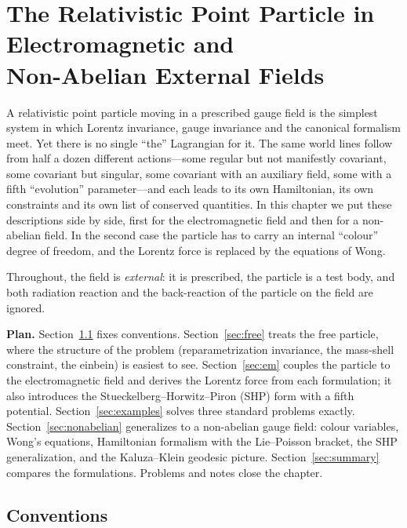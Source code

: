 \documentclass[11pt,a4paper]{book}
\numberwithin{equation}{section}
\theoremstyle{definition}
\theoremstyle{remark}
\begin{document}
\chapter[Relativistic Particle in Gauge Fields]{The Relativistic Point Particle in Electromagnetic and\\ Non-Abelian External Fields}
\label{ch:particle}

A relativistic point particle moving in a prescribed gauge field is the
simplest system in which Lorentz invariance, gauge invariance and the
canonical formalism meet.  Yet there is no single ``the'' Lagrangian for
it.  The same world lines follow from half a dozen different actions---some
regular but not manifestly covariant, some covariant but singular, some
covariant with an auxiliary field, some with a fifth ``evolution''
parameter---and each leads to its own Hamiltonian, its own constraints and
its own list of conserved quantities.  In this chapter we put these
descriptions side by side, first for the electromagnetic field and then for
a non-abelian field.  In the second case the particle has to carry an
internal ``colour'' degree of freedom, and the Lorentz force is replaced by
the equations of Wong.

Throughout, the field is \emph{external}: it is prescribed, the particle is
a test body, and both radiation reaction and the back-reaction of the
particle on the field are ignored.

\medskip
\noindent\textbf{Plan.}
Section~\ref{sec:conv} fixes conventions.  Section~\ref{sec:free} treats the
free particle, where the structure of the problem (reparametrization
invariance, the mass-shell constraint, the einbein) is easiest to see.
Section~\ref{sec:em} couples the particle to the electromagnetic field and
derives the Lorentz force from each formulation; it also introduces the
Stueckelberg--Horwitz--Piron (SHP) form with a fifth potential.
Section~\ref{sec:examples} solves three standard problems exactly.
Section~\ref{sec:nonabelian} generalizes to a non-abelian gauge field:
colour variables, Wong's equations, Hamiltonian formalism with the
Lie--Poisson bracket, the SHP generalization, and the Kaluza--Klein
geodesic picture.  Section~\ref{sec:summary} compares the formulations.
Problems and notes close the chapter.

\section{Conventions}\label{sec:conv}
\end{document}
